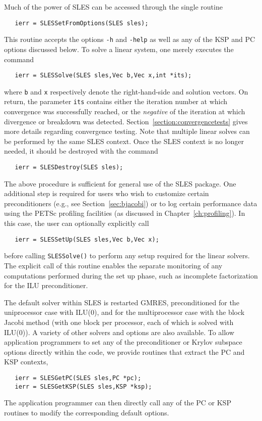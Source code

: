 Much of the power of SLES can be accessed through the single routine
\begin{verbatim}
   ierr = SLESSetFromOptions(SLES sles);
\end{verbatim}
This 
routine accepts the options {\tt -h} and {\tt -help} as well as 
any of the KSP and PC options discussed below. 
To solve a linear system, one merely executes the command 
\begin{verbatim}
   ierr = SLESSolve(SLES sles,Vec b,Vec x,int *its);
\end{verbatim}
where {\tt b} and {\tt x} respectively denote the right-hand-side and
solution vectors.  On return, the parameter {\tt its} contains
either the iteration number at which convergence was successfully
reached, or the {\em negative} of the iteration at which divergence or
breakdown was detected.  Section~\ref{section:convergencetests} gives
more details regarding convergence testing.
Note that multiple linear solves can be performed by the same SLES context.
Once the SLES context is no longer needed, it should be destroyed with the 
command 
\begin{verbatim}
   ierr = SLESDestroy(SLES sles);
\end{verbatim}

The above procedure is sufficient for general use of the SLES package.
One additional step is required for users who wish to customize certain 
preconditioners (e.g., see Section~\ref{sec:bjacobi}) or to log certain 
performance data using the PETSc profiling facilities (as discussed in 
Chapter~\ref{ch:profiling}).
In this case, the user can optionally explicitly call 
\begin{verbatim}
   ierr = SLESSetUp(SLES sles,Vec b,Vec x);
\end{verbatim}
before calling {\tt SLESSolve()} to perform any setup required for 
the linear solvers.  The explicit call of this routine enables the
separate monitoring of any computations performed during the set up
phase, such as incomplete factorization for the ILU preconditioner.

The default solver within SLES is restarted GMRES, preconditioned for
the uniprocessor case with ILU(0), and for the multiprocessor case
with the block Jacobi method (with one block per processor, each of
which is solved with ILU(0)). A variety of other solvers
and options are also available.
To allow application programmers to set any of the preconditioner or 
Krylov subspace options directly within the code, we provide routines
that extract the PC and KSP contexts, 
\begin{verbatim}
   ierr = SLESGetPC(SLES sles,PC *pc);
   ierr = SLESGetKSP(SLES sles,KSP *ksp);
\end{verbatim}
The application programmer can then directly call any of the PC or KSP 
routines to modify the corresponding default options.   

